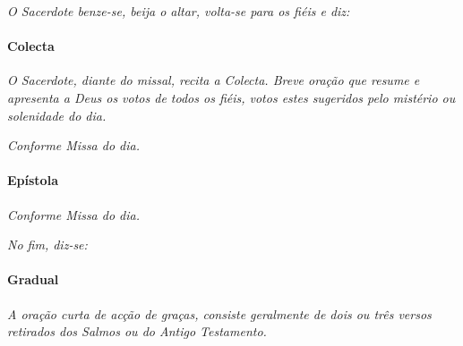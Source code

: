 \textit{O Sacerdote benze-se, beija o altar, volta-se para os fiéis e diz:}

\begin{paracol}{2}\switchcolumn{}\switchcolumn*{}\switchcolumn{}\end{paracol}

\paragraph{Colecta}

\textit{O Sacerdote, diante do missal, recita a Colecta. Breve oração que resume e apresenta a Deus os votos de todos os fiéis, votos estes sugeridos pelo mistério ou solenidade do dia.}

\begin{paracol}{2}\switchcolumn{}\end{paracol}

\emph{Conforme Missa do dia.}

\begin{paracol}{2}\switchcolumn{}\switchcolumn*{}\switchcolumn{}\end{paracol}

\paragraph{Epístola}

\emph{Conforme Missa do dia.}

\textit{No fim, diz-se:}

\begin{paracol}{2}\switchcolumn{}\end{paracol}

\paragraph{Gradual}

\textit{A oração curta de acção de graças, consiste geralmente de dois ou três versos retirados dos Salmos ou do Antigo Testamento.}

